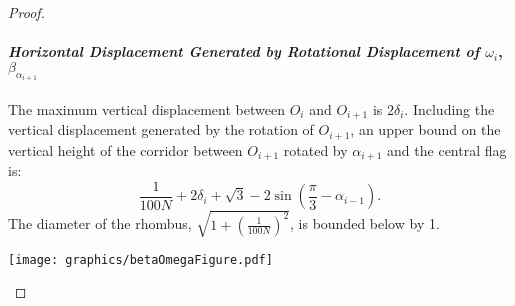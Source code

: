 \documentclass[10pt]{CSUNthesis}
\theoremstyle{plain}%
\theoremstyle{definition}
\theoremstyle{remark}
\newcommand{\lr}[1]{\left( #1 \right)}
\begin{document}
\begin{proof}
\paragraph{\textit{Horizontal Displacement Generated by Rotational Displacement of $\omega_i$}, $\beta_{\alpha_{i+1}}$}
The maximum vertical displacement between $O_i$ and $O_{i+1}$ is $2 \delta_i$.  
Including the vertical displacement generated by the rotation of $O_{i+1}$, an upper bound on the vertical height of the corridor between $O_{i+1}$ rotated by $\alpha_{i+1}$ and the central flag is:
$$\frac{1}{100N} + 2 \delta_i + \sqrt{3}- 2 \sin \lr{\frac{\pi}{3} - \alpha_{i-1}}.$$
The diameter of the rhombus, $\sqrt{1 + \lr{\frac{1}{100N}}^2}$, is bounded below by 1.

\begin{minipage}{\linewidth}
\begin{center}
\texttt{[image: graphics/betaOmegaFigure.pdf]}
\label{fig:betaOmegaFigure.pdf}
\end{center}
\end{minipage}


\end{proof}
\end{document}
